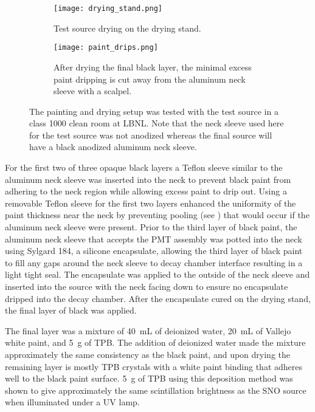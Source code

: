 \begin{figure}
\begin{subfigure}[t]{.29\textwidth}
\centering
\texttt{[image: drying\_stand.png]}
\caption{Test source drying on the drying stand.}
\end{subfigure}
\hfill
\begin{subfigure}[t]{.67\textwidth}
\centering
\texttt{[image: paint\_drips.png]}
\caption{After drying the final black layer, the minimal excess paint dripping is cut away from the aluminum neck sleeve with a scalpel.}
\end{subfigure}
\caption{The painting and drying setup was tested with the test source in a class 1000 clean room at LBNL. Note that the neck sleeve used here for the test source was not anodized whereas the final source will have a black anodized aluminum neck sleeve.}
\label{fig:drying}
\end{figure}


For the first two of three opaque black layers a Teflon sleeve similar to the aluminum neck sleeve was inserted into the neck to prevent black paint from adhering to the neck region while allowing excess paint to drip out. Using a removable Teflon sleeve for the first two layers enhanced the uniformity of the paint thickness near the neck by preventing pooling (see ) that would occur if the aluminum neck sleeve were present. Prior to the third layer of black paint, the aluminum neck sleeve that accepts the PMT assembly was potted into the neck using Sylgard 184, a silicone encapsulate, allowing the third layer of black paint to fill any gaps around the neck sleeve to decay chamber interface resulting in a light tight seal. The encapsulate was applied to the outside of the neck sleeve and inserted into the source with the neck facing down to ensure no encapsulate dripped into the decay chamber. After the encapsulate cured on the drying stand, the final layer of black was applied.

The final layer was a mixture of 40~mL of deionized water, 20~mL of Vallejo white paint, and 5~g of TPB. The addition of deionized water made the mixture approximately the same consistency as the black paint, and upon drying the remaining layer is mostly TPB crystals with a white paint binding that adheres well to the black paint surface. 5~g of TPB using this deposition method was shown to give approximately the same scintillation brightness as the SNO \Li source when illuminated under a UV lamp.

